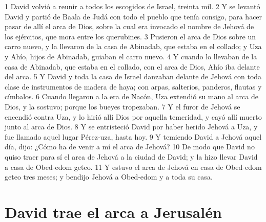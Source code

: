1 David volvió a reunir a todos los escogidos de Israel, treinta mil.
2 Y se levantó David y partió de Baala de Judá con todo el pueblo que tenía consigo, para hacer pasar de allí el arca de Dios, sobre la cual era invocado el nombre de Jehová de los ejércitos, que mora entre los querubines. 
3 Pusieron el arca de Dios sobre un carro nuevo, y la llevaron de la casa de Abinadab, que estaba en el collado; y Uza y Ahío, hijos de Abinadab, guiaban el carro nuevo.
4 Y cuando lo llevaban de la casa de Abinadab, que estaba en el collado, con el arca de Dios, Ahío iba delante del arca.
5 Y David y toda la casa de Israel danzaban delante de Jehová con toda clase de instrumentos de madera de haya; con arpas, salterios, panderos, flautas y címbalos.
6 Cuando llegaron a la era de Nacón, Uza extendió su mano al arca de Dios, y la sostuvo; porque los bueyes tropezaban.
7 Y el furor de Jehová se encendió contra Uza, y lo hirió allí Dios por aquella temeridad, y cayó allí muerto junto al arca de Dios.
8 Y se entristeció David por haber herido Jehová a Uza, y fue llamado aquel lugar Pérez-uza, hasta hoy.
9 Y temiendo David a Jehová aquel día, dijo: ¿Cómo ha de venir a mí el arca de Jehová?
10 De modo que David no quiso traer para sí el arca de Jehová a la ciudad de David; y la hizo llevar David a casa de Obed-edom geteo.
11 Y estuvo el arca de Jehová en casa de Obed-edom geteo tres meses; y bendijo Jehová a Obed-edom y a toda su casa. 

\section*{David trae el arca a Jerusalén}

